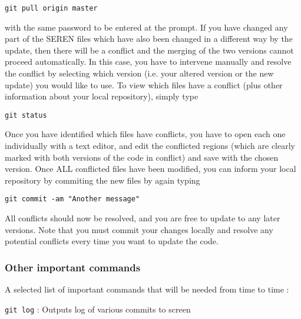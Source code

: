 \documentclass[a4paper]{article}
\newcommand{\var}[1]{\texttt{#1}}
\begin{document}
\var{git pull origin master} \newline

\noindent with the same password to be entered at the prompt.  If you have changed any part of the SEREN files which have also been changed in a different way by the update, then there will be a conflict and the merging of the two versions cannot proceed automatically.  In this case, you have to intervene manually and resolve the conflict by selecting which version (i.e. your altered version or the new update) you would like to use.  To view which files have a conflict (plus other information about your local repository), simply type \newline

\var{git status} \newline

\noindent Once you have identified which files have conflicts, you have to open each one individually with a text editor, and edit the conflicted regions (which are clearly marked with both versions of the code in conflict) and save with the chosen version.  Once ALL conflicted files have been modified, you can inform your local repository by commiting the new files by again typing \newline

\var{git commit -am "Another message"} \newline

\noindent All conflicts should now be resolved, and you are free to update to any later versions.  Note that you must commit your changes locally and resolve any potential conflicts every time you want to update the code. 



\subsubsection{Other important commands}
A selected list of important commands that will be needed from time to time : \newline

\var{git log}           : Outputs log of various commits to screen
\end{document}
